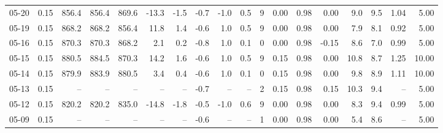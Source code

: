 \begin{threeparttable}
{\begin{tabular}{lrrrrrrrrrrrrrrrrr}
  05-20 &     0.15 & 856.4 & 856.4 & 869.6 &      -13.3 &           -1.5 &                      -0.7 &                     -1.0 &                 0.5 &              9 &       0.00 &      0.98 &           0.00 &              9.0 &                 9.5 &            1.04 &                   5.00 \\
  05-19 &     0.15 & 868.2 & 868.2 & 856.4 &       11.8 &            1.4 &                      -0.6 &                      1.0 &                 0.5 &              9 &       0.00 &      0.98 &           0.00 &              7.9 &                 8.1 &            0.92 &                   5.00 \\
  05-16 &     0.15 & 870.3 & 870.3 & 868.2 &        2.1 &            0.2 &                      -0.8 &                      1.0 &                 0.1 &              0 &       0.00 &      0.98 &          -0.15 &              8.6 &                 7.0 &            0.99 &                   5.00 \\
  05-15 &     0.15 & 880.5 & 884.5 & 870.3 &       14.2 &            1.6 &                      -0.6 &                      1.0 &                 0.5 &              9 &       0.15 &      0.98 &           0.00 &             10.8 &                 8.7 &            1.25 &                  10.00 \\
  05-14 &     0.15 & 879.9 & 883.9 & 880.5 &        3.4 &            0.4 &                      -0.6 &                      1.0 &                 0.1 &              0 &       0.15 &      0.98 &           0.00 &              9.8 &                 8.9 &            1.11 &                  10.00 \\
  05-13 &     0.15 &    -- &    -- &    -- &         -- &             -- &                      -0.7 &                       -- &                  -- &              2 &       0.15 &      0.98 &           0.15 &             10.3 &                 9.4 &              -- &                   5.00 \\
  05-12 &     0.15 & 820.2 & 820.2 & 835.0 &      -14.8 &           -1.8 &                      -0.5 &                     -1.0 &                 0.6 &              9 &       0.00 &      0.98 &           0.00 &              8.3 &                 9.4 &            0.99 &                   5.00 \\
  05-09 &     0.15 &    -- &    -- &    -- &         -- &             -- &                      -0.6 &                       -- &                  -- &              1 &       0.00 &      0.98 &           0.00 &              5.4 &                 8.6 &              -- &                   5.00 \\

\end{tabular}}
\end{threeparttable}
